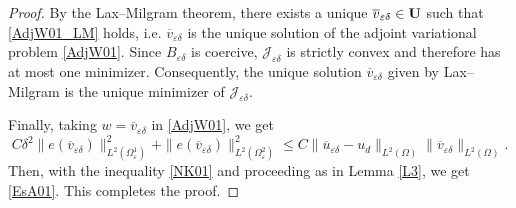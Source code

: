 \documentclass[11pt,a4paper]{article}
\numberwithin{equation}{section}
\def\wo{\overline}
\def\O{\Omega}
\def\d{\delta}
\def\e{\varepsilon}
\def\a{{\alpha}}
\def\Ga{{\bf a}}
\def\R{{\mathbb{R}}}
\def\R{{\mathbb{R}}}
\def\ed{{\varepsilon\delta}}
\def\Ga{{\bf a}}
\def\GU{{\bf U}}
\begin{document}
\begin{proof}
		By the Lax--Milgram theorem, there exists a unique $\wo v_\ed\in\GU$ such that \eqref{AdjW01_LM} holds, i.e.
		$\wo v_\ed$ is the unique solution of the adjoint variational problem \eqref{AdjW01}.
%		
		Since $B_\ed$ is coercive, $\mathcal J_\ed$ is strictly convex and therefore has at most one minimizer.
		Consequently, the unique solution $\wo v_\ed$ given by Lax--Milgram is the unique minimizer of $\mathcal J_\ed$.
		
		Finally, taking $w=\wo v_\ed$ in \eqref{AdjW01}, we get
		$$C\d^2\|e(\wo v_\ed)\|^2_{L^2(\O^1_\e)}+\|e(\wo v_\ed)\|^2_{L^2(\O^2_\e)}\leq C\|\wo u_\ed-u_d\|_{L^2(\O)}\|\wo v_\ed\|_{L^2(\O)}.$$
		Then, with the inequality \eqref{NK01} and proceeding as in Lemma \ref{L3}, we get \eqref{EsA01}.
		This completes the proof.
	\end{proof}
	
	
%	
	
\end{document}
